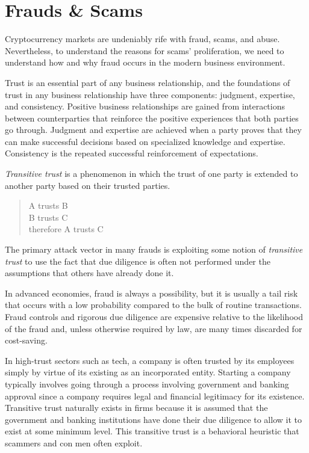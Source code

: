 \chapter{Frauds \& Scams}

Cryptocurrency markets are undeniably rife with fraud, scams, and abuse.
Nevertheless, to understand the reasons for scams' proliferation, we need to
understand how and why fraud occurs in the modern business environment.

Trust is an essential part of any business relationship, and the foundations of
trust in any business relationship have three components: judgment, expertise,
and consistency. Positive business relationships are gained from interactions
between counterparties that reinforce the positive experiences that both parties
go through. Judgment and expertise are achieved when a party proves that they
can make successful decisions based on specialized knowledge and expertise.
Consistency is the repeated successful reinforcement of expectations.

\textit{Transitive trust} is a phenomenon in which the trust of one party is
extended to another party based on their trusted parties.

\begin{quote}
A trusts B \\
B trusts C \\
therefore A trusts C\\
\end{quote}

The primary attack vector in many frauds is exploiting some notion of
\textit{transitive trust} to use the fact that due diligence is often not
performed under the assumptions that others have already done it.


In advanced economies, fraud is always a possibility, but it is usually a tail
risk that occurs with a low probability compared to the bulk of routine
transactions. Fraud controls and rigorous due diligence are expensive relative
to the likelihood of the fraud and, unless otherwise required by law, are many
times discarded for cost-saving.

In high-trust sectors such as tech, a company is often trusted by its employees
simply by virtue of its existing as an incorporated entity. Starting a company
typically involves going through a process involving government and banking
approval since a company requires legal and financial legitimacy for its
existence. Transitive trust naturally exists in firms because it is assumed that
the government and banking institutions have done their due diligence to allow
it to exist at some minimum level. This transitive trust is a behavioral
heuristic that scammers and con men often exploit. \cite{balleisen_fraud_2017}


